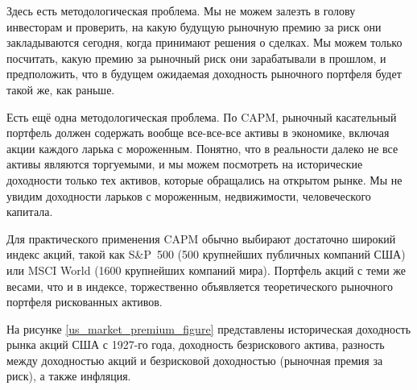 Здесь есть методологическая проблема. Мы не можем залезть в голову инвесторам и 
проверить, на какую будущую рыночную премию за риск они закладываются сегодня, 
когда принимают решения о сделках. Мы можем только посчитать, какую премию за 
рыночный риск они зарабатывали в прошлом, и предположить, что в будущем 
ожидаемая доходность рыночного портфеля будет такой же, как раньше.

Есть ещё одна методологическая проблема. По CAPM, рыночный касательный портфель 
должен содержать вообще все-все-все активы в экономике, включая акции каждого 
ларька с мороженным. Понятно, что в реальности далеко не все активы являются 
торгуемыми, и мы можем посмотреть на исторические доходности только тех активов, 
которые обращались на открытом рынке. Мы не увидим доходности ларьков с 
мороженным, недвижимости, человеческого капитала.

Для практического применения CAPM обычно выбирают достаточно широкий индекс 
акций, такой как S\&P~500 (500 крупнейших публичных компаний США) или MSCI World 
(1600 крупнейших компаний мира). Портфель акций с теми же весами, что и в 
индексе, торжественно объявляется  теоретического 
рыночного портфеля рискованных активов.

На рисунке \ref{us_market_premium_figure} представлены историческая доходность 
рынка акций США с 1927-го года, доходность безрискового актива, разность между 
доходностью акций и безрисковой доходностью (рыночная премия за риск), а также 
инфляция.


